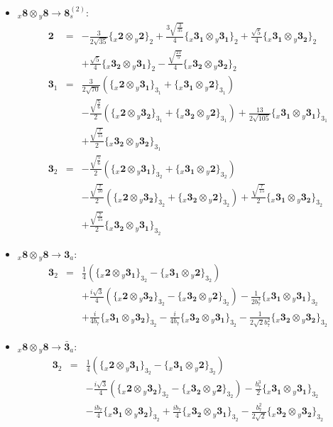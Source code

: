 \documentclass[english]{article}
\newcommand{\rep}[1]{\mathbf{#1}}
\newcommand{\repx}[2]{{}_{#2}\mathbf{#1}}
\newcommand{\subcg}[3]{\big\{ \repx{#1}{x}\otimes\repx{#2}{y}\big\}^{}_{#3}}
\begin{document}
\begin{itemize}
\item $\repx{8}{x}\otimes\repx{8}{y}\to\rep{8}_{s}^{(2)}$:
\begin{eqnarray*}
\rep{2} &=& -\frac{3}{2 \sqrt{35}}\subcg{2}{2}{2}+\frac{3 \sqrt{\frac{3}{35}}}{4}\subcg{3_{1}}{3_{1}}{2}+\frac{\sqrt{5}}{4}\subcg{3_{1}}{3_{2}}{2} \\ 
 & & +\frac{\sqrt{5}}{4}\subcg{3_{2}}{3_{1}}{2}-\frac{\sqrt{\frac{21}{5}}}{4}\subcg{3_{2}}{3_{2}}{2}
\\
\rep{3}_{1} &=& \frac{3}{2 \sqrt{70}}\left(\subcg{2}{3_{1}}{3_{1}}+\subcg{3_{1}}{2}{3_{1}}\right) \\ 
 & & -\frac{\sqrt{\frac{5}{6}}}{2}\left(\subcg{2}{3_{2}}{3_{1}}+\subcg{3_{2}}{2}{3_{1}}\right)+\frac{13}{2 \sqrt{105}}\subcg{3_{1}}{3_{1}}{3_{1}} \\ 
 & & +\frac{\sqrt{\frac{7}{15}}}{2}\subcg{3_{2}}{3_{2}}{3_{1}}
\\
\rep{3}_{2} &=& -\frac{\sqrt{\frac{5}{6}}}{2}\left(\subcg{2}{3_{1}}{3_{2}}+\subcg{3_{1}}{2}{3_{2}}\right) \\ 
 & & -\frac{\sqrt{\frac{7}{10}}}{2}\left(\subcg{2}{3_{2}}{3_{2}}+\subcg{3_{2}}{2}{3_{2}}\right)+\frac{\sqrt{\frac{7}{15}}}{2}\subcg{3_{1}}{3_{2}}{3_{2}} \\ 
 & & +\frac{\sqrt{\frac{7}{15}}}{2}\subcg{3_{2}}{3_{1}}{3_{2}}
\end{eqnarray*}
\item $\repx{8}{x}\otimes\repx{8}{y}\to\rep{3}_{a}$:
\begin{eqnarray*}
\rep{3}_{2} &=& \frac{1}{4}\left(\subcg{2}{3_{1}}{3_{2}}-\subcg{3_{1}}{2}{3_{2}}\right) \\ 
 & & +\frac{i \sqrt{3}}{4}\left(\subcg{2}{3_{2}}{3_{2}}-\subcg{3_{2}}{2}{3_{2}}\right)-\frac{1}{2 b_7^3}\subcg{3_{1}}{3_{1}}{3_{2}} \\ 
 & & +\frac{i}{4 b_7}\subcg{3_{1}}{3_{2}}{3_{2}}-\frac{i}{4 b_7}\subcg{3_{2}}{3_{1}}{3_{2}}-\frac{1}{2 \sqrt{2} b_7^2}\subcg{3_{2}}{3_{2}}{3_{2}}
\end{eqnarray*}
\item $\repx{8}{x}\otimes\repx{8}{y}\to\rep{\bar{3}}_{a}$:
\begin{eqnarray*}
\rep{3}_{2} &=& \frac{1}{4}\left(\subcg{2}{3_{1}}{3_{2}}-\subcg{3_{1}}{2}{3_{2}}\right) \\ 
 & & -\frac{i \sqrt{3}}{4}\left(\subcg{2}{3_{2}}{3_{2}}-\subcg{3_{2}}{2}{3_{2}}\right)-\frac{b_7^3}{2}\subcg{3_{1}}{3_{1}}{3_{2}} \\ 
 & & -\frac{i b_7}{4}\subcg{3_{1}}{3_{2}}{3_{2}}+\frac{i b_7}{4}\subcg{3_{2}}{3_{1}}{3_{2}}-\frac{b_7^2}{2 \sqrt{2}}\subcg{3_{2}}{3_{2}}{3_{2}}

\end{eqnarray*}
\end{itemize}
\end{document}
